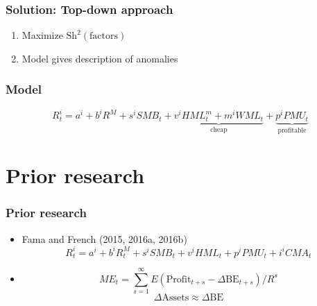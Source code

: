 \documentclass[notes]{beamer}  %
\begin{document}
\begin{frame} \frametitle{Solution: Top-down approach}
  \begin{enumerate}
    \item Maximize $\text{Sh}^2(\text{factors})$  %
    \item Model gives description of anomalies  %
  \end{enumerate}
\end{frame}


\begin{frame} \frametitle{Model}
  \begin{equation} \label{eq:B16}
    R_t^i = a^i+b^iR^M+s^iSMB_t+\underbrace{v^iHML_t^m+m^iWML_t}_\text{cheap}+\underbrace{p^iPMU_t}_\text{profitable}
  \end{equation}
\end{frame}


\section{Prior research}

\begin{frame} \frametitle{Prior research}
  \begin{itemize}
    \item Fama and French (2015, 2016a, 2016b)
    \begin{equation} \label{eq:F16}
      R_t^i=a^i + b^iR_t^M + s^iSMB_t + v^iHML_t + p^iPMU_t + i^iCMA_t
    \end{equation}
    \item \textcite{fama2006profitability}
    \[ME_t = \sum_{s=1}^\infty E\left( \text{Profit}_{t+s}-\Delta\text{BE}_{t+s}\right) /R^s\]
    \[\Delta\text{Assets}\approx \Delta\text{BE}\]
  \end{itemize}
\end{frame}
\end{document}
